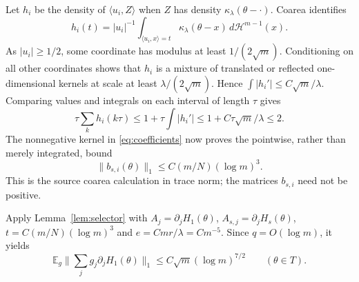 \documentclass[11pt]{article}
\theoremstyle{remark}\newtheorem{remark}[theorem]{Remark}
\numberwithin{equation}{section}
\newcommand{\E}{\mathbb E}\newcommand{\Prob}{\mathbb P}
\newcommand{\ip}[2]{\langle #1,#2\rangle}
\newcommand{\norm}[1]{\lVert #1\rVert}
\begin{document}
Let $h_i$ be the density of $\ip{u_i}Z$ when $Z$ has density
$\kappa_\lambda(\theta-\cdot)$. Coarea identifies
\[
 h_i(t)=|u_i|^{-1}\int_{\ip{u_i}x=t}
                  \kappa_\lambda(\theta-x)\,d\mathcal H^{m-1}(x).
\]
As $|u_i|\ge1/2$, some coordinate has modulus at least $1/(2\sqrt m)$.
Conditioning on all other coordinates shows that $h_i$ is a mixture of
translated or reflected one-dimensional kernels at scale at least
$\lambda/(2\sqrt m)$. Hence $\int|h_i'|\le C\sqrt m/\lambda$.
Comparing values and integrals on each interval of length $\tau$ gives
\[
 \tau\sum_k h_i(k\tau)\le1+\tau\int|h_i'|
 \le1+C\tau\sqrt m/\lambda\le2.
\]
The nonnegative kernel in \eqref{eq:coefficients} now proves the
pointwise, rather than merely integrated, bound
\begin{equation}\label{eq:budget}
 \norm{b_{s,i}(\theta)}_1\le C(m/N)(\log m)^3.
\end{equation}
This is the source coarea calculation in trace norm; the matrices
$b_{s,i}$ need not be positive.

Apply Lemma~\ref{lem:selector} with $A_j=\partial_jH_1(\theta)$,
$A_{s,j}=\partial_jH_s(\theta)$, $t=C(m/N)(\log m)^3$ and
$e=Cmr/\lambda=Cm^{-5}$. Since $q=O(\log m)$, it yields
\begin{equation}\label{eq:GaussianGrad}
 \E_g\norm{\sum_jg_j\partial_jH_1(\theta)}_1
 \le C\sqrt m(\log m)^{7/2}\qquad(\theta\in T).
\end{equation}
\end{document}
